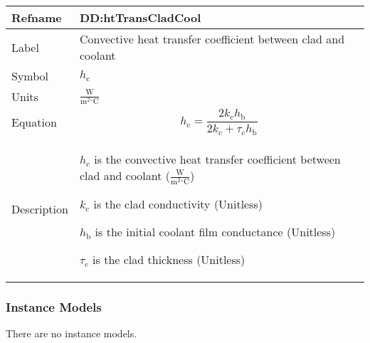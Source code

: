 \documentclass[12pt]{article}
\begin{document}
\begin{minipage}{\textwidth}
\begin{tabular}{>{\raggedright}p{}>{\raggedright\arraybackslash}p{}}
\toprule \textbf{Refname} & \textbf{DD:htTransCladCool}
\label{DD:htTransCladCool}
\\ \midrule
Label & Convective heat transfer coefficient between clad and coolant
        
\\ \midrule
Symbol & ${h_{\text{c}}}$
         
\\ \midrule
Units & $\frac{\text{W}}{\text{m}^{2}{}^{\circ}\text{C}}$
        
\\ \midrule
Equation & \begin{displaymath}
           {h_{\text{c}}}=\frac{2 {k_{\text{c}}} {h_{\text{b}}}}{2 {k_{\text{c}}}+{τ_{\text{c}}} {h_{\text{b}}}}
           \end{displaymath}
\\ \midrule
Description & \begin{symbDescription}
              \item{${h_{\text{c}}}$ is the convective heat transfer coefficient between clad and coolant ($\frac{\text{W}}{\text{m}^{2}{}^{\circ}\text{C}}$)}
              \item{${k_{\text{c}}}$ is the clad conductivity (Unitless)}
              \item{${h_{\text{b}}}$ is the initial coolant film conductance (Unitless)}
              \item{${τ_{\text{c}}}$ is the clad thickness (Unitless)}
              \end{symbDescription}
\\ \bottomrule
\end{tabular}
\end{minipage}
\subsubsection{Instance Models}
\label{Sec:IMs}
There are no instance models.
\end{document}
